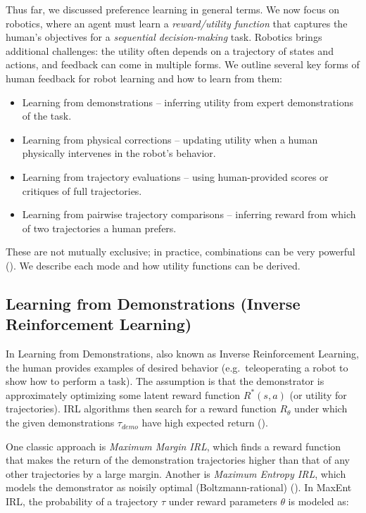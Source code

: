 \documentclass[
  letterpaper,
  numbers=noenddot,
  DIV=11]{scrreprt}
\providecommand{\tightlist}{%
  \setlength{\itemsep}{0pt}\setlength{\parskip}{0pt}}\usepackage{longtable,booktabs,array}
\theoremstyle{plain}
\theoremstyle{definition}
\theoremstyle{remark}
\begin{document}
Thus far, we discussed preference learning in general terms. We now
focus on robotics, where an agent must learn a \emph{reward/utility
function} that captures the human's objectives for a \emph{sequential
decision-making} task. Robotics brings additional challenges: the
utility often depends on a trajectory of states and actions, and
feedback can come in multiple forms. We outline several key forms of
human feedback for robot learning and how to learn from them:

\begin{itemize}
\tightlist
\item
  Learning from demonstrations -- inferring utility from expert
  demonstrations of the task.
\item
  Learning from physical corrections -- updating utility when a human
  physically intervenes in the robot's behavior.
\item
  Learning from trajectory evaluations -- using human-provided scores or
  critiques of full trajectories.
\item
  Learning from pairwise trajectory comparisons -- inferring reward from
  which of two trajectories a human prefers.
\end{itemize}

These are not mutually exclusive; in practice, combinations can be very
powerful
(). We
describe each mode and how utility functions can be derived.

\subsection*{Learning from Demonstrations (Inverse Reinforcement
Learning)}\label{learning-from-demonstrations-inverse-reinforcement-learning}

In Learning from Demonstrations, also known as Inverse Reinforcement
Learning, the human provides examples of desired behavior
(e.g.~teleoperating a robot to show how to perform a task). The
assumption is that the demonstrator is approximately optimizing some
latent reward function \(R^*(s,a)\) (or utility for trajectories). IRL
algorithms then search for a reward function \(R_\theta\) under which
the given demonstrations \(\tau_{demo}\) have high expected return
().

One classic approach is \emph{Maximum Margin IRL}, which finds a reward
function that makes the return of the demonstration trajectories higher
than that of any other trajectories by a large margin. Another is
\emph{Maximum Entropy IRL}, which models the demonstrator as noisily
optimal (Boltzmann-rational)
(). In
MaxEnt IRL, the probability of a trajectory \(\tau\) under reward
parameters \(\theta\) is modeled as:
\end{document}
